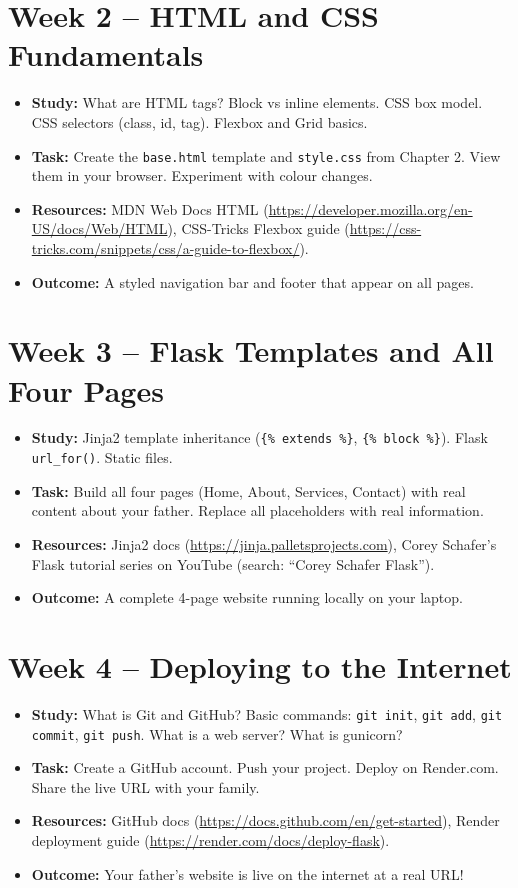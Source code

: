 \documentclass[12pt, a4paper]{book}
\begin{document}
\section{Week 2 -- HTML and CSS Fundamentals}
\begin{itemize}[leftmargin=1.5em]
  \item \textbf{Study:} What are HTML tags? Block vs inline elements. CSS box model.
        CSS selectors (class, id, tag). Flexbox and Grid basics.
  \item \textbf{Task:} Create the \texttt{base.html} template and \texttt{style.css} from Chapter 2.
        View them in your browser. Experiment with colour changes.
  \item \textbf{Resources:} MDN Web Docs HTML (\url{https://developer.mozilla.org/en-US/docs/Web/HTML}),
        CSS-Tricks Flexbox guide (\url{https://css-tricks.com/snippets/css/a-guide-to-flexbox/}).
  \item \textbf{Outcome:} A styled navigation bar and footer that appear on all pages.
\end{itemize}

\section{Week 3 -- Flask Templates and All Four Pages}
\begin{itemize}[leftmargin=1.5em]
  \item \textbf{Study:} Jinja2 template inheritance (\texttt{\{\% extends \%\}}, \texttt{\{\% block \%\}}).
        Flask \texttt{url\_for()}. Static files.
  \item \textbf{Task:} Build all four pages (Home, About, Services, Contact) with real content
        about your father. Replace all placeholders with real information.
  \item \textbf{Resources:} Jinja2 docs (\url{https://jinja.palletsprojects.com}),
        Corey Schafer's Flask tutorial series on YouTube (search: ``Corey Schafer Flask'').
  \item \textbf{Outcome:} A complete 4-page website running locally on your laptop.
\end{itemize}

\section{Week 4 -- Deploying to the Internet}
\begin{itemize}[leftmargin=1.5em]
  \item \textbf{Study:} What is Git and GitHub? Basic commands: \texttt{git init},
        \texttt{git add}, \texttt{git commit}, \texttt{git push}.
        What is a web server? What is gunicorn?
  \item \textbf{Task:} Create a GitHub account. Push your project.
        Deploy on Render.com. Share the live URL with your family.
  \item \textbf{Resources:} GitHub docs (\url{https://docs.github.com/en/get-started}),
        Render deployment guide (\url{https://render.com/docs/deploy-flask}).
  \item \textbf{Outcome:} Your father's website is live on the internet at a real URL!
\end{itemize}
\end{document}
